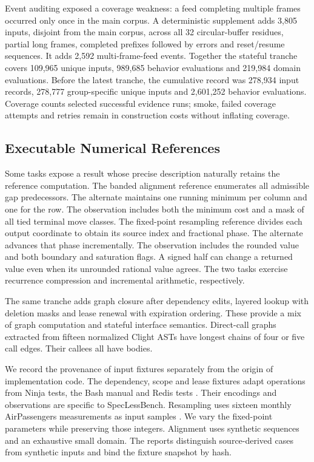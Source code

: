 \documentclass{article}
\begin{document}
Event auditing exposed a coverage weakness: a feed completing multiple frames occurred only once in the main corpus. A deterministic supplement adds 3,805 inputs, disjoint from the main corpus, across all 32 circular-buffer residues, partial long frames, completed prefixes followed by errors and reset/resume sequences. It adds 2,592 multi-frame-feed events. Together the stateful tranche covers 109,965 unique inputs, 989,685 behavior evaluations and 219,984 domain evaluations. Before the latest tranche, the cumulative record was 278,934 input records, 278,777 group-specific unique inputs and 2,601,252 behavior evaluations. Coverage counts selected successful evidence runs; smoke, failed coverage attempts and retries remain in construction costs without inflating coverage.

\subsection{Executable Numerical References}

Some tasks expose a result whose precise description naturally retains the reference computation. The banded alignment reference enumerates all admissible gap predecessors. The alternate maintains one running minimum per column and one for the row. The observation includes both the minimum cost and a mask of all tied terminal move classes. The fixed-point resampling reference divides each output coordinate to obtain its source index and fractional phase. The alternate advances that phase incrementally. The observation includes the rounded value and both boundary and saturation flags. A signed half can change a returned value even when its unrounded rational value agrees. The two tasks exercise recurrence compression and incremental arithmetic, respectively.

The same tranche adds graph closure after dependency edits, layered lookup with deletion masks and lease renewal with expiration ordering. These provide a mix of graph computation and stateful interface semantics. Direct-call graphs extracted from fifteen normalized Clight ASTs have longest chains of four or five call edges. Their callees all have bodies.

We record the provenance of input fixtures separately from the origin of implementation code. The dependency, scope and lease fixtures adapt operations from Ninja tests, the Bash manual and Redis tests \citep{ninjaGraphFixture,bashScopeFixture,redisExpiryFixture}. Their encodings and observations are specific to SpecLessBench. Resampling uses sixteen monthly AirPassengers measurements as input samples \citep{rPassengersFixture}. We vary the fixed-point parameters while preserving those integers. Alignment uses synthetic sequences and an exhaustive small domain. The reports distinguish source-derived cases from synthetic inputs and bind the fixture snapshot by hash.
\end{document}
